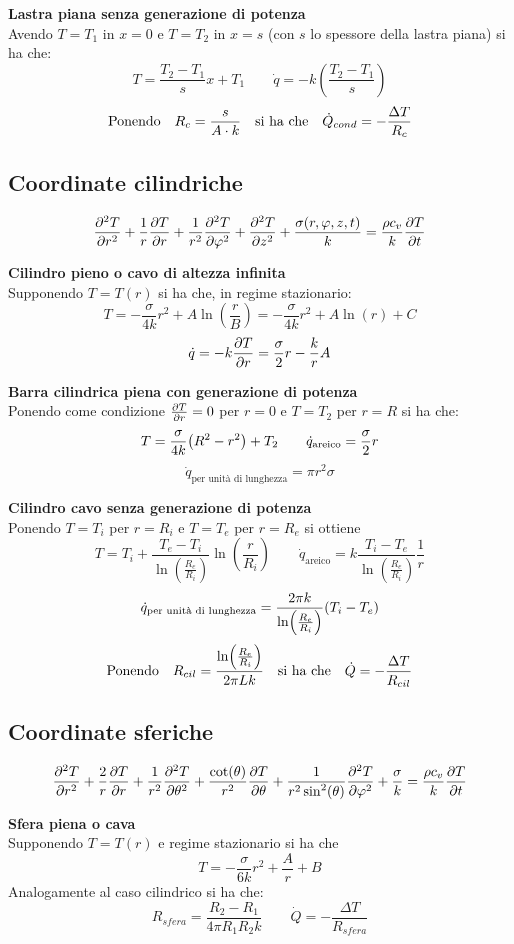 \textbf{Lastra piana senza generazione di potenza}\\
Avendo $T=T_1$ in $x=0$ e $T = T_2$ in $x=s$ (con $s$ lo spessore della lastra piana) si ha che:
\[ T = \frac{T_2 - T_1}{s}x + T_1 \qquad \dot{q} = -k \left(\frac{T_2 - T_1}{s} \right) \]
\[\qq*{Ponendo} R_c = \frac{s}{A \cdot k} \qq{si ha che} \dot{Q}_{cond} = -\frac{\Delta T}{R_c}\]

\subsection{Coordinate cilindriche}
\[ \pdv[2]{T}{r} + \frac{1}{r}\pdv{T}{r} + \frac{1}{r^2}\pdv[2]{T}{\varphi} + \pdv[2]{T}{z} + \frac{\sigma(r,\varphi,z,t)}{k} = \frac{\rho c_v}{k} \pdv{T}{t} \]

\textbf{Cilindro pieno o cavo di altezza infinita}\\
Supponendo $T=T(r)$ si ha che, in regime stazionario:
\[T = -\frac{\sigma}{4k}r^2 + A\ln(\frac{r}{B}) = -\frac{\sigma}{4k}r^2 + A\ln(r) + C \]
\[\dot{q} = -k \pdv{T}{r} = \frac{\sigma}{2}r - \frac{k}{r}A \]

\textbf{Barra cilindrica piena con generazione di potenza}\\
Ponendo come condizione $\pdv{T}{r} = 0$ per $r = 0$ e $T = T_2$ per $r = R$ si ha che:
\[T = \frac{\sigma}{4k}\qty(R^2-r^2) + T_2 \qquad \dot{q}_{\text{areico}} = \frac{\sigma}{2}r \]
\[\dot{q}_{\text{per unità di lunghezza}} = \pi r^2 \sigma \]

\textbf{Cilindro cavo senza generazione di potenza}\\
Ponendo $T = T_i$ per $r = R_i$ e $T = T_e$ per $r = R_e$ si ottiene
\[T = T_i + \frac{T_e - T_i}{\ln(\frac{R_e}{R_i})}\ln(\frac{r}{R_i}) \qquad \dot{q}_{\text{areico}} = k \frac{T_i-T_e}{\ln(\frac{R_e}{R_i})}\frac{1}{r}\]
\[\dot{q}_{\text{per unità di lunghezza}} = \frac{2\pi k}{\ln(\frac{R_e}{R_i})}\qty(T_i - T_e) \]
\[\qq*{Ponendo} R_{cil} = \frac{\ln(\frac{R_e}{R_i})}{2\pi L k} \qq{si ha che} \dot{Q} = -\frac{\Delta T}{R_{cil}}\]

\subsection{Coordinate sferiche}
\[ \pdv[2]{T}{r} + \frac{2}{r}\pdv{T}{r} + \frac{1}{r^2}\pdv[2]{T}{\theta} + \frac{\cot(\theta)}{r^2}\pdv{T}{\theta} + \frac{1}{r^2 \sin^2(\theta)}\pdv[2]{T}{\varphi} + \frac{\sigma}{k} = \frac{\rho c_v}{k} \pdv{T}{t} \]

\textbf{Sfera piena o cava}\\
Supponendo $T = T(r)$ e regime stazionario si ha che
\[ T = -\frac{\sigma}{6k}r^2 + \frac{A}{r} + B \]
Analogamente al caso cilindrico si ha che:
\[ R_{sfera} = \frac{R_2 - R_1}{4\pi R_1 R_2 k} \qquad \dot{Q} = -\frac{\Delta T}{R_{sfera}} \]
